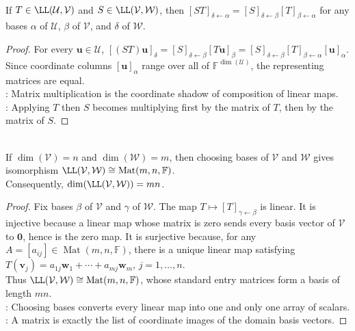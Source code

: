\begin{proposition} \label{prop:composition-and-matrix-multiplication} \\
If $T \in \LL(\mathcal{U}, \mathcal{V})$ and $S \in \LL(\mathcal{V}, \mathcal{W})$, then $[ST]_{\delta \leftarrow \alpha} = [S]_{\delta \leftarrow \beta}[T]_{\beta \leftarrow \alpha}$ for any bases $\alpha$ of $\mathcal{U}$, $\beta$ of $\mathcal{V}$, and $\delta$ of $\mathcal{W}$.
\begin{proof}
For every $\mathbf{u}\in\mathcal{U}$, $[(ST)\mathbf{u}]_{\delta}=[S]_{\delta \leftarrow \beta}[T\mathbf{u}]_{\beta}=[S]_{\delta \leftarrow \beta}[T]_{\beta \leftarrow \alpha}[\mathbf{u}]_{\alpha}$.\\
Since coordinate columns $[\mathbf{u}]_{\alpha}$ range over all of $\mathbb{F}^{\dim(\mathcal{U})}$, the representing matrices are equal.\\
: Matrix multiplication is the coordinate shadow of composition of linear maps.\\
: Applying $T$ then $S$ becomes multiplying first by the matrix of $T$, then by the matrix of $S$.
\end{proof}
\end{proposition}

\begin{theorem} \label{thm:linear-maps-and-matrices-same-data} \\
If $\dim(\mathcal{V}) = n$ and $\dim(\mathcal{W}) = m$, then choosing bases of $\mathcal{V}$ and $\mathcal{W}$ gives isomorphism $\LL(\mathcal{V}, \mathcal{W}) \cong \operatorname{Mat}(m,n,\mathbb{F})$.\\
Consequently, $\dim(\LL(\mathcal{V}, \mathcal{W})) = mn$.
\begin{proof}
Fix bases $\beta$ of $\mathcal{V}$ and $\gamma$ of $\mathcal{W}$. The map $T\mapsto [T]_{\gamma \leftarrow \beta}$ is linear. It is injective because a linear map whose matrix is zero sends every basis vector of $\mathcal{V}$ to $\mathbf{0}$, hence is the zero map. It is surjective because, for any $A=[a_{ij}]\in\operatorname{Mat}(m,n,\mathbb{F})$, there is a unique linear map satisfying $T(\mathbf{v}_j)=a_{1j}\mathbf{w}_1+\cdots+a_{mj}\mathbf{w}_m$, $j=1,\ldots,n$.\\
Thus $\LL(\mathcal{V},\mathcal{W})\cong\operatorname{Mat}(m,n,\mathbb{F})$, whose standard entry matrices form a basis of length $mn$.\\
: Choosing bases converts every linear map into one and only one array of scalars.\\
: A matrix is exactly the list of coordinate images of the domain basis vectors.
\end{proof}
\end{theorem}

